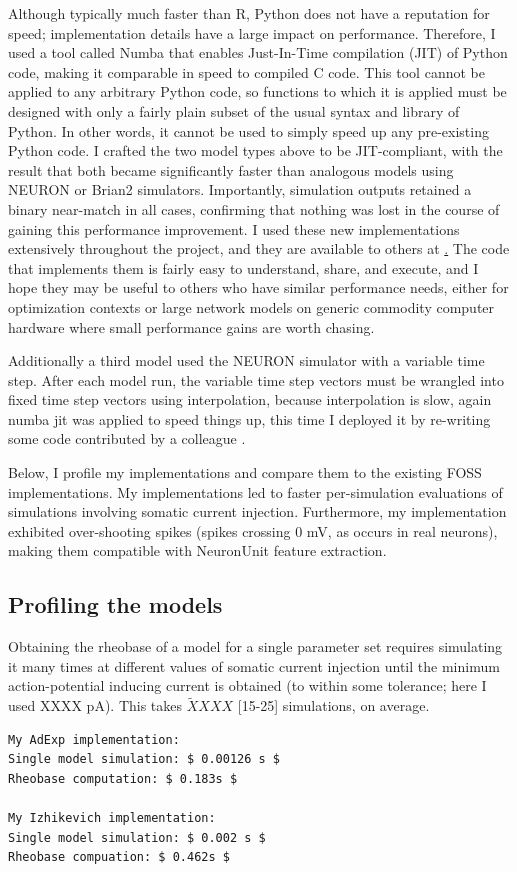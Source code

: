 Although typically much faster than R, Python does not have a reputation for speed; implementation details have a large impact on performance.
Therefore, I used a tool called Numba \cite{lam2015numba} that enables Just-In-Time compilation (JIT) of Python code, making it comparable in speed to compiled C code.
This tool cannot be applied to any arbitrary Python code, so functions to which it is applied must be designed with only a fairly plain subset of the usual syntax and library of Python.
In other words, it cannot be used to simply speed up any pre-existing Python code.
I crafted the two model types above to be JIT-compliant, with the result that both became significantly faster than analogous models using NEURON or Brian2 simulators.
Importantly, simulation outputs retained a binary near-match in all cases, confirming that nothing was lost in the course of gaining this performance improvement.
I used these new implementations extensively throughout the project, and they are available to others at \href{https://github.com/russelljjarvis/jit_hub.git}. The code that implements them is fairly easy to understand, share, and execute, and I hope they may be useful to others who have similar performance needs, either for optimization contexts or large network models on generic commodity computer hardware where small performance gains are worth chasing. 

Additionally a third model used the NEURON simulator with a variable time step. After each model run, the variable time step vectors must be wrangled into fixed time step vectors using interpolation, because interpolation is slow, again numba jit was applied to speed things up, this time I deployed it by re-writing some code contributed by a colleague \cite{birgiolas2019towards}.

Below, I profile my implementations and compare them to the existing FOSS implementations.
My implementations led to faster per-simulation evaluations of simulations involving somatic current injection. 
Furthermore, my implementation exhibited over-shooting spikes (spikes crossing 0 mV, as occurs in real neurons), making them compatible with NeuronUnit feature extraction.

\subsection{Profiling the models}
Obtaining the rheobase of a model for a single parameter set requires simulating it many times at different values of somatic current injection until the minimum action-potential inducing current is obtained (to within some tolerance; here I used XXXX pA).
This takes $\tilde XXXX$ [15-25] simulations, on average.
\begin{verbatim}
My AdExp implementation:
Single model simulation: $ 0.00126 s $
Rheobase computation: $ 0.183s $

My Izhikevich implementation:
Single model simulation: $ 0.002 s $
Rheobase compuation: $ 0.462s $ 
\end{verbatim}



